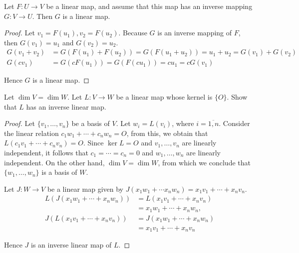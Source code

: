 \begin{exercise}
    Let $F: U\to V$ be a linear map, and assume that this map has an inverse mapping $G: V\to U$. Then $G$ is a linear map.
\end{exercise}

\begin{proof}
    Let $v_{1} = F(u_{1}), v_{2} = F(u_{2})$. Because $G$ is an inverse mapping of $F$, then $G(v_{1}) = u_{1}$ and $G(v_{2}) = u_{2}$.
    \begin{align*}
        G(v_{1} + v_{2}) & = G(F(u_{1}) + F(u_{2})) = G(F(u_{1} + u_{2})) = u_{1} + u_{2} = G(v_{1}) + G(v_{2}) \\
        G(cv_{1})        & = G(cF(u_{1})) = G(F(cu_{1})) = cu_{1} = cG(v_{1})
    \end{align*}

    Hence $G$ is a linear map.
\end{proof}

\begin{exercise}
    Let $\dim V = \dim W$. Let $L: V \to W$ be a linear map whose kernel is $\{ O \}$. Show that $L$ has an inverse linear map.
\end{exercise}

\begin{proof}
    Let $\{ v_{1}, \ldots, v_{n} \}$ be a basis of $V$. Let $w_{i} = L(v_{i})$, where $i = \overline{1, n}$. Consider the linear relation $c_{1}w_{1} + \cdots + c_{n}w_{n} = O$, from this, we obtain that $L(c_{1}v_{1} + \cdots + c_{n}v_{n}) = O$. Since $\ker L = O$ and $v_{1}, \ldots, v_{n}$ are linearly independent, it follows that $c_{1} = \cdots = c_{n} = 0$ and $w_{1}, \ldots, w_{n}$ are linearly independent. On the other hand, $\dim V = \dim W$, from which we conclude that $\{ w_{1}, \ldots, w_{n} \}$ is a basis of $W$.

    Let $J: W \to V$ be a linear map given by $J(x_{1}w_{1} + \cdots x_{n}w_{n}) = x_{1}v_{1} + \cdots + x_{n}v_{n}$.
    \begin{align*}
        L(J(x_{1}w_{1} + \cdots + x_{n}w_{n})) & = L(x_{1}v_{1} + \cdots + x_{n}v_{n}) \\
                                               & = x_{1}w_{1} + \cdots + x_{n}w_{n},   \\
        J(L(x_{1}v_{1} + \cdots + x_{n}v_{n})) & = J(x_{1}w_{1} + \cdots + x_{n}w_{n}) \\
                                               & = x_{1}v_{1} + \cdots + x_{n}v_{n}
    \end{align*}

    Hence $J$ is an inverse linear map of $L$.
\end{proof}

